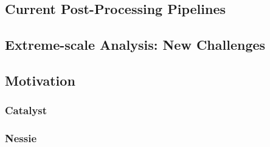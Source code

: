 \subsection{Current Post-Processing Pipelines}

\subsection{Extreme-scale Analysis: New Challenges}



\subsection{Motivation}


\subsubsection{Catalyst}

\subsubsection{Nessie}
